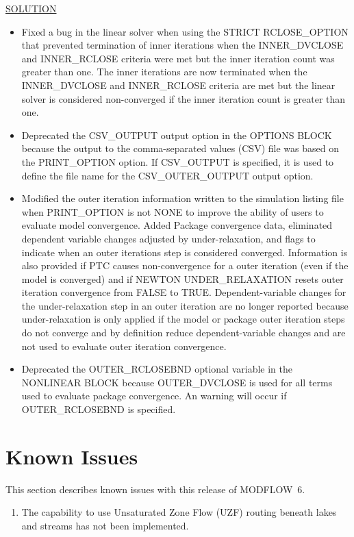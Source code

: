\documentclass[11pt,twoside,twocolumn]{usgsreport}
\begin{document}
\begin{itemize}
	\underline{SOLUTION}
	\begin{itemize}
		\item Fixed a bug in the linear solver when using the STRICT RCLOSE\_OPTION that prevented termination of inner iterations when the INNER\_DVCLOSE and INNER\_RCLOSE criteria were met but the inner iteration count was greater than one. The inner iterations are now terminated when the INNER\_DVCLOSE and INNER\_RCLOSE criteria are met but the linear solver is considered non-converged if the inner iteration count is greater than one.
		\item Deprecated the CSV\_OUTPUT output option in the OPTIONS BLOCK because the output to the comma-separated values (CSV) file was based on the PRINT\_OPTION option. If CSV\_OUTPUT is specified, it is used to define the file name for the CSV\_OUTER\_OUTPUT output option.
		\item Modified the outer iteration information written to the simulation listing file when PRINT\_OPTION is not NONE to improve the ability of users to evaluate model convergence. Added Package convergence data, eliminated dependent variable changes adjusted by under-relaxation, and flags to indicate when an outer iterations step is considered converged. Information is also provided if PTC causes non-convergence for a outer iteration (even if the model is converged) and if NEWTON UNDER\_RELAXATION resets outer iteration convergence from FALSE to TRUE. Dependent-variable changes for the under-relaxation step in an outer iteration are no longer reported because under-relaxation is only applied if the model or package outer iteration steps do not converge and by definition reduce dependent-variable changes and are not used to evaluate outer iteration convergence.
		\item Deprecated the OUTER\_RCLOSEBND optional variable in the NONLINEAR BLOCK because OUTER\_DVCLOSE is used for all terms used to evaluate package convergence. An warning will occur if OUTER\_RCLOSEBND is specified.
	\end{itemize}

\end{itemize}


\section{Known Issues}
This section describes known issues with this release of MODFLOW~6.

\begin{enumerate}

\item
The capability to use Unsaturated Zone Flow (UZF) routing beneath lakes and streams has not been implemented.

\end{enumerate}
\end{document}

